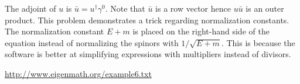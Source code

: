 \documentclass[12pt]{article}
\begin{document}
\noindent
The adjoint of $u$ is $\bar{u}=u^\dag\gamma^0$.
Note that $\bar{u}$ is a row vector hence $u\bar{u}$ is an outer product.
This problem demonstrates a trick regarding normalization constants.
The normalization constant $E+m$ is placed on the right-hand side of the equation
instead of normalizing the spinors with $1/\sqrt{E+m}$.
This is because the software is better at simplifying expressions with multipliers
instead of divisors.



\noindent
\url{http://www.eigenmath.org/example6.txt}
\end{document}
